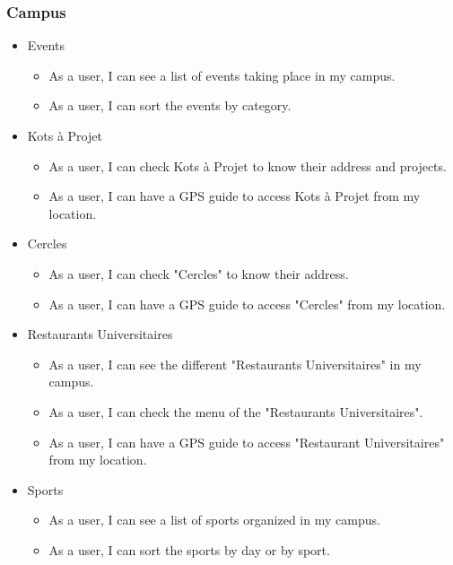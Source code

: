 \documentclass{eplmastersthesis}
\begin{document}
\subsubsection{Campus}

\begin{itemize}

\item{Events}
\begin{itemize} 
\item As a user, I can see a list of events taking place in my campus.
\item As a user, I can sort the events by category.
\end{itemize}

\item{Kots à Projet}
\begin{itemize}
\item As a user, I can check Kots à Projet to know their address and projects.
\item As a user, I can have a GPS guide to access Kots à Projet from my location.
\end{itemize}

\item{Cercles}
\begin{itemize}
\item As a user, I can check "Cercles" to know their address.
\item As a user, I can have a GPS guide to access "Cercles" from my location.
\end{itemize}

\item{Restaurants Universitaires}
\begin{itemize}
\item As a user, I can see the different "Restaurants Universitaires" in my campus.
\item As a user, I can check the menu of the "Restaurants Universitaires".
\item As a user, I can have a GPS guide to access "Restaurant Universitaires" from my location.
\end{itemize}

\item{Sports}
\begin{itemize}
\item As a user, I can see a list of sports organized in my campus.
\item As a user, I can sort the sports by day or by sport.
\end{itemize}

\end{itemize}
\end{document}
